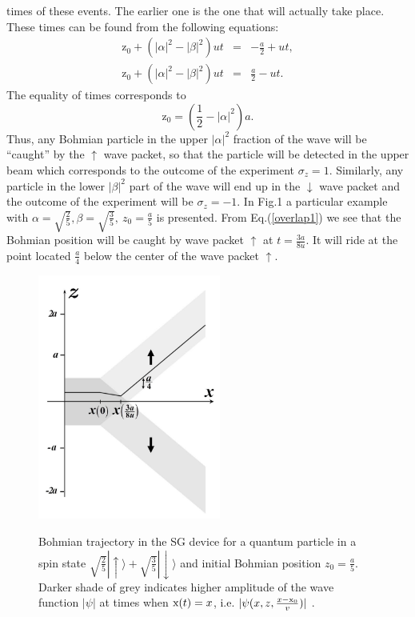 \documentclass[preprint,tightenlines]{elsarticle}
\begin{document}
times of these events. The earlier one  is the one that
will actually take place. These times can be found from the following
equations:
\begin{eqnarray}
\mathrm{z}_{0}+\left(|\alpha|^{2}-|\beta|^{2}\right)ut & = & -\frac{a}{2}+ut,\label{overlap1}\\
\mathrm{z}_{0}+\left(|\alpha|^{2}-|\beta|^{2}\right)ut & = & \frac{a}{2}-ut.
\end{eqnarray}
 The equality of times corresponds to
 \begin{equation}
\mathrm{z}_{0}=\left(\frac{1}{2}-|\alpha|^{2}\right)a.
\end{equation}
 Thus, any Bohmian particle in the upper $|\alpha|^{2}$ fraction of
the wave will be ``caught'' by the $\uparrow$ wave packet, so that the
particle will be detected in the upper beam which corresponds to the
outcome of the experiment $\sigma_{z}=1$. Similarly, any particle
in the lower $|\beta|^{2}$ part of the wave will end up in the
$\downarrow$ wave packet and the outcome of the experiment will be $\sigma_{z}=-1$.
In Fig.1 a particular example with $\alpha=\sqrt{\frac{2}{5}},\beta=\sqrt{\frac{3}{5}},~z_{0}=\frac{a}{5}$
is presented. From Eq.(\ref{overlap1}) we see that the Bohmian position
will be caught by wave packet $\uparrow$ at $t=\frac{{3a}}{{8u}}$. It will
ride at the point located $\frac{a}{4}$ below the center of the wave
packet $\uparrow$.


\begin{figure}[t]
  \includegraphics[width=6cm]{1.pdf}\\
  \vspace {-5pt}
    \caption{Bohmian trajectory in the SG device for a quantum particle in a spin state \break $\sqrt{\frac{2}{5}}|\uparrow\rangle+\sqrt{\frac{3}{5}}|\downarrow\rangle$ and initial Bohmian position $z_{0}=\frac{a}{5}$. Darker shade of grey indicates higher amplitude of the wave function $|\psi|$ at  times  when ${\rm x}(t)=x$, i.e. $|\psi(x,z,\frac{x-{\rm x}_0}{v})|$ .}
\end{figure}
\end{document}
